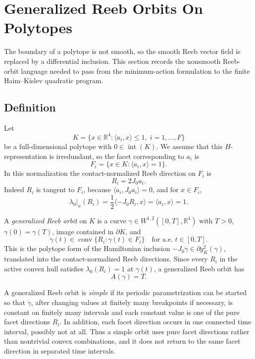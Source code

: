\section{Generalized Reeb Orbits On Polytopes}\label{sec:generalized-reeb-orbits-polytopes}

The boundary of a polytope is not smooth, so the smooth Reeb vector field is
replaced by a differential inclusion. This section records the nonsmooth
Reeb-orbit language needed to pass from the minimum-action formulation to the
finite Haim--Kislev quadratic program.

\subsection{Definition}\label{subsec:generalized-reeb-orbits-polytopes-definition}

Let
\[
  K=\{x\in\mathbb{R}^4:\langle a_i,x\rangle\leq 1,\; i=1,\ldots,F\}
\]
be a full-dimensional polytope with \(0\in\operatorname{int}(K)\). We assume
that this \(H\)-representation is irredundant, so the facet corresponding to
\(a_i\) is
\[
  F_i=\{x\in K:\langle a_i,x\rangle=1\}.
\]
In this normalization the contact-normalized Reeb direction on \(F_i\) is
\begin{equation}\label{eq:generalized-reeb-facet-vector}
  R_i=2J_0a_i.
\end{equation}
Indeed \(R_i\) is tangent to \(F_i\), because
\(\langle a_i,J_0a_i\rangle=0\), and for \(x\in F_i\),
\[
  \lambda_0|_x(R_i)
  =\frac{1}{2}\langle -J_0R_i,x\rangle
  =\langle a_i,x\rangle
  =1.
\]

A \emph{generalized Reeb orbit} on \(K\) is a curve
\(\gamma\in W^{1,2}([0,T],\mathbb{R}^4)\) with \(T>0\),
\(\gamma(0)=\gamma(T)\), image contained in \(\partial K\), and
\begin{equation}\label{eq:generalized-reeb-inclusion}
  \dot{\gamma}(t)
  \in \operatorname{conv}\{R_i:\gamma(t)\in F_i\}
  \quad\text{for a.e. }t\in[0,T].
\end{equation}
This is the polytope form of the Hamiltonian inclusion
\(-J_0\dot{\gamma}\in\partial g_K^2(\gamma)\), translated into the
contact-normalized Reeb directions. Since every \(R_i\) in the active convex
hull satisfies \(\lambda_0(R_i)=1\) at \(\gamma(t)\), a generalized Reeb orbit
has
\[
  A(\gamma)=T.
\]

A generalized Reeb orbit is \emph{simple} if its periodic parametrization can
be started so that \(\dot{\gamma}\), after changing values at finitely many
breakpoints if necessary, is constant on finitely many intervals and each
constant value is one of the pure facet directions \(R_i\). In addition, each
facet direction occurs in one connected time interval, possibly not at all.
Thus a simple orbit uses pure facet directions rather than nontrivial convex
combinations, and it does not return to the same facet direction in separated
time intervals.

